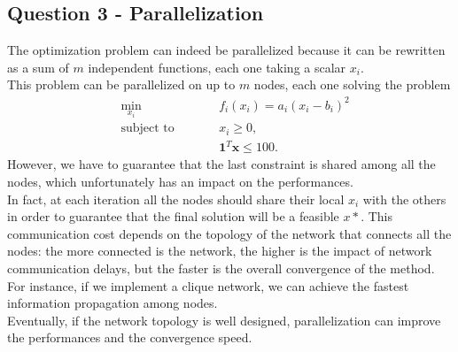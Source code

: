 \documentclass[]{article}
\begin{document}
\subsection*{Question 3 - Parallelization}
The optimization problem can indeed be parallelized because it can be rewritten as a sum of $m$ independent functions, each one taking a scalar $x_i$.\\
This problem can be parallelized on up to $m$ nodes, each one solving the problem
\begin{subequations}
	\begin{alignat*}{2}
		&\!\min_{x_i} &\qquad& f_i(x_i) = a_i(x_i-b_i)^2\\
		&\text{subject to} &      & x_i\geq0,\\
		&&&  \mathbf{1}^T\mathbf{x} \leq 100.
	\end{alignat*}
\end{subequations}
However, we have to guarantee that the last constraint is shared among all the nodes, which unfortunately has an impact on the performances.\\
In fact, at each iteration all the nodes should share their local $x_i$ with the others in order to guarantee that the final solution will be a feasible $x*$. This communication cost depends on the topology of the network that connects all the nodes: the more connected is the network, the higher is the impact of network communication delays, but the faster is the overall convergence of the method.\\
For instance, if we implement a clique network, we can achieve the fastest information propagation among nodes.\\
Eventually, if the network topology is well designed, parallelization can improve the performances and the convergence speed.
\end{document}
